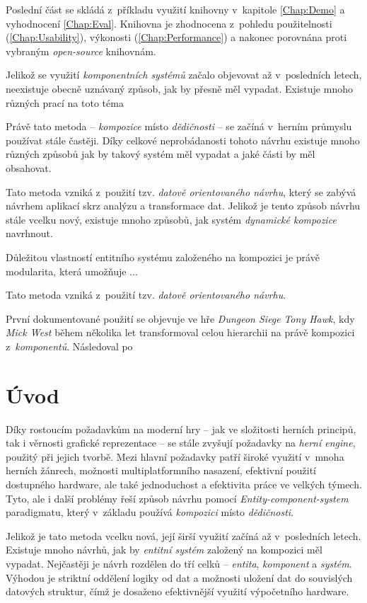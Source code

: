 Poslední část se skládá z~příkladu využití knihovny v~kapitole \ref{Chap:Demo} a vyhodnocení \ref{Chap:Eval}. Knihovna je zhodnocena z~pohledu použitelnosti (\ref{Chap:Usability}), výkonosti (\ref{Chap:Performance}) a nakonec porovnána proti vybraným \emph{open-source} knihovnám.

Jelikož se využití \emph{komponentních systémů} začalo objevovat až v~posledních letech, neexistuje obecně uznávaný způsob, jak by přesně měl vypadat. Existuje mnoho různých prací na toto téma

Právě tato metoda -- \emph{kompozice} místo \emph{dědičnosti} -- se začíná v~herním průmyslu používat stále častěji. Díky celkové neprobádanosti tohoto návrhu existuje mnoho různých způsobů jak by takový systém měl vypadat a jaké části by měl obsahovat.

Tato metoda vzniká z~použití tzv. \emph{datově orientovaného návrhu}\cite{DOD}, který se zabývá návrhem aplikací skrz analýzu a transformace dat. Jelikož je tento způsob návrhu stále vcelku nový, existuje mnoho způsobů, jak systém \emph{dynamické kompozice} navrhnout. 

Důležitou vlastností entitního systému založeného na kompozici je právě modularita, která umožňuje ...

Tato metoda vzniká z~použití tzv. \emph{datově orientovaného návrhu}\cite{DOD}.

První dokumentované použití se objevuje ve hře \emph{Dungeon Siege}\cite{DungeonSiege} \emph{Tony Hawk}, kdy \emph{Mick West} během několika let transformoval celou hierarchii na právě kompozici z~\emph{komponentů}. Následoval po

\fi

\chapter{Úvod}

Díky rostoucím požadavkům na moderní hry -- jak ve složitosti herních principů, tak i věrnosti grafické reprezentace -- se stále zvyšují požadavky na \emph{herní engine}, použitý při jejich tvorbě. Mezi hlavní požadavky patří široké využití v~mnoha herních žánrech, možnosti multiplatformního nasazení, efektivní použití dostupného hardware, ale také jednoduchost a efektivita práce ve velkých týmech. Tyto, ale i další problémy řeší způsob návrhu pomocí \emph{Entity-component-system} paradigmatu, který v~základu používá \emph{kompozici} místo \emph{dědičnosti}.

Jelikož je tato metoda vcelku nová, její širší využití začíná až v~posledních letech. Existuje mnoho návrhů, jak by \emph{entitní systém} založený na kompozici měl vypadat. Nejčastěji je návrh rozdělen do tří celků -- \emph{entita}, \emph{komponent} a \emph{systém}. Výhodou je striktní oddělení logiky od dat a možnosti uložení dat do souvislých datových struktur, čímž je dosaženo efektivnější využití výpočetního hardware.

